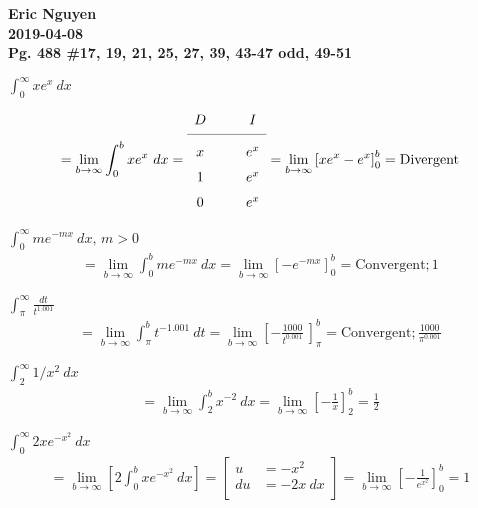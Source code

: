 \documentclass[12pt]{article}
\newenvironment{problem}[2][]{
    \begin{trivlist}
        \item[
            {\bfseries #1}
            {\bfseries #2.}
        ]
}{\end{trivlist}}
\newcommand{\assignment}{Pg. 488 \#17, 19, 21, 25, 27, 39, 43-47 odd, 49-51}
\newcommand{\name}{Eric Nguyen}
\newcommand{\duedate}{2019-04-08}
\newcommand{\details}{\noindent\textbf{\name \\\duedate \\\assignment}}
\newcommand{\subu}[2]{
\left[
\begin{alignedat}{1}
u &= #1 \\
du &= #2 \\
\end{alignedat}
\right] 
}
\newcommand{\tikzmark}[1]{%
    \tikz[overlay, remember picture, baseline] \node (#1) {};%
}
\begin{document}
\details

\begin{problem}{17}
$\displaystyle\int_0^\infty x e^x ~ dx$
\begin{align}
= \underset{b \to \infty}{\lim} \int_0^b xe^{x} ~ dx = 
\renewcommand{\arraystretch}{1.5}
\begin{array}{c @{\hspace*{1.0cm}} c}
D & I \\
\cmidrule{1-2}
x \tikzmark{D1} & \tikzmark{I1}e^{x} \\
1 \tikzmark{D2} & \tikzmark{I2}e^{x} \\
0 \tikzmark{D3} & \tikzmark{I3}e^{x}
\end{array} = \underset{b \to \infty}{\lim} \left[x e^{x} - e^{x}\right]_0^b = \text{Divergent}
\end{align}
\end{problem}

\begin{problem}{19}
$\displaystyle\int_0^\infty me^{-mx} ~ dx, \, m > 0$
\begin{align}
= \underset{b \to \infty}{\lim} \int_0^b me^{-mx} ~ dx = \underset{b \to \infty}{\lim} \left[- e^{-mx}\right]_0^b = \text{Convergent}; 1
\end{align}
\end{problem}

\begin{problem}{21}
$\displaystyle\int_\pi^\infty \frac{dt}{t^{1.001}}$
\begin{align}
= \underset{b \to \infty}{\lim} \int_\pi^b t^{-1.001} ~ dt = \underset{b \to \infty}{\lim} \left[- \frac{1000}{t^{0.001}} ~ \right]_\pi^b = \text{Convergent}; \frac{1000}{\pi^{0.001}}
\end{align}
\end{problem}

\begin{problem}{25}
$\displaystyle\int_2^\infty 1 / x^2 ~ dx$
\begin{align}
= \underset{b \to \infty}{\lim} \int_2^b x^{-2} ~ dx = \underset{b \to \infty}{\lim} \left[- \frac{1}{x}\right]_2^b = \frac{1}{2}
\end{align}
\end{problem}

\begin{problem}{27}
$\displaystyle\int_0^\infty 2xe^{-x^2} ~ dx$
\begin{align}
= \underset{b \to \infty}{\lim} \left[2 \int_0^b xe^{-x^2} ~ dx\right] = \subu{-x^2}{- 2x ~ dx} = \underset{b \to \infty}{\lim} \left[- \frac{1}{e^{x^2}}\right]_0^b = 1
\end{align}
\end{problem}
\end{document}
